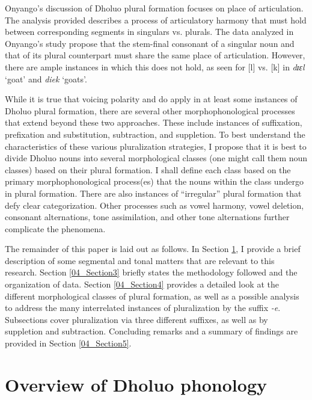 \documentclass[output=paper,colorlinks,citecolor=brown]{langscibook}
\begin{document}
Onyango's \citeyearpar{Onyango2016} discussion of Dholuo plural formation focuses on place of articulation. The analysis provided describes a process of articulatory harmony that must hold between corresponding segments in singulars vs. plurals. The data analyzed in Onyango's study propose that the stem-final consonant of a singular noun and that of its plural counterpart must share the same place of articulation. However, there are ample instances in which this does not hold, as seen for [l] vs. [k] in \textit{dɪɛl} `goat' and \textit{diek} `goats'.

\begin{sloppypar}
While it is true that voicing polarity and  do apply in at least some instances of Dholuo plural formation, there are several other morphophonological processes that extend beyond these two approaches. These include instances of suffixation, prefixation and substitution, subtraction, and suppletion. To best understand the characteristics of these various pluralization strategies, I propose that it is best to divide Dholuo nouns into several morphological classes (one might call them noun classes) based on their plural formation. I shall define each class based on the primary morphophonological process(es) that the nouns within the class undergo in plural formation. There are also instances of ``irregular'' plural formation that defy clear categorization. Other processes such as vowel harmony, vowel deletion, consonant alternations, tone assimilation, and other tone alternations further complicate the phenomena.
\end{sloppypar}

The remainder of this paper is laid out as follows. In Section \ref{04_Section2}, I provide a brief description of some segmental and tonal matters that are relevant to this research. Section \ref{04_Section3} briefly states the methodology followed and the organization of data. Section \ref{04_Section4} provides a detailed look at the different morphological classes of plural formation, as well as a possible analysis to address the many interrelated instances of pluralization by the suffix \textit{-e}. Subsections cover pluralization via three different suffixes, as well as by suppletion and subtraction. Concluding remarks and a summary of findings are provided in Section \ref{04_Section5}.

\section{Overview of Dholuo phonology} \label{04_Section2}
\end{document}
